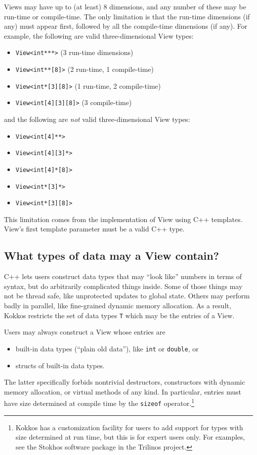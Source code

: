 Views may have up to (at least) 8 dimensions, and any number of these
may be run-time or compile-time.  The only limitation is that the
run-time dimensions (if any) must appear first, followed by all the
compile-time dimensions (if any).  For example, the following are
valid three-dimensional View types:
\begin{itemize}
\item \lstinline!View<int***>!  (3 run-time dimensions)
\item \lstinline!View<int**[8]>!  (2 run-time, 1 compile-time)
\item \lstinline!View<int*[3][8]>!  (1 run-time, 2 compile-time)
\item \lstinline!View<int[4][3][8]>!  (3 compile-time)
\end{itemize}
and the following are \emph{not} valid three-dimensional View types:
\begin{itemize}
\item \lstinline!View<int[4]**>!
\item \lstinline!View<int[4][3]*>!
\item \lstinline!View<int[4]*[8]>!
\item \lstinline!View<int*[3]*>!
\item \lstinline!View<int*[3][8]>!
\end{itemize}
This limitation comes from the implementation of View using C++
templates.  View's first template parameter must be a valid C++ type.

\subsection{What types of data may a View contain?}

C++ lets users construct data types that may ``look like'' numbers in
terms of syntax, but do arbitrarily complicated things inside.  Some
of those things may not be thread safe, like unprotected updates to
global state.  Others may perform badly in parallel, like fine-grained
dynamic memory allocation.  As a result, Kokkos restricts the set of
data types \texttt{T} which may be the entries of a View.

Users may always construct a View whose entries are 
\begin{itemize}
\item built-in data types (``plain old data''), like \texttt{int} or
  \texttt{double}, or
\item structs of built-in data types.
\end{itemize}
The latter specifically forbids nontrivial destructors, constructors
with dynamic memory allocation, or virtual methods of any kind.  In
particular, entries must have size determined at compile time by the
\texttt{sizeof} operator.\footnote{Kokkos has a customization facility
  for users to add support for types with size determined at run time,
  but this is for expert users only.  For examples, see the Stokhos
  software package in the Trilinos project.}

